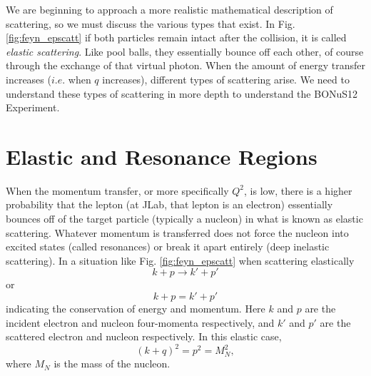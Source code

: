 We are beginning to approach a more realistic mathematical description of scattering, so we must discuss the various types that exist. In Fig. \ref{fig:feyn_epscatt} if both particles remain intact after the collision, it is called \textit{elastic scattering}. Like pool balls, they essentially bounce off each other, of course through the exchange of that virtual photon. When the amount of energy transfer increases ($i.e.$ when $q$ increases), different types of scattering arise. We need to understand these types of scattering in more depth to understand the BONuS12 Experiment.
\newpage
\section{Elastic and Resonance Regions}
When the momentum transfer, or more specifically $Q^2$, is low, there is a higher probability that the lepton (at JLab, that lepton is an electron) essentially bounces off of the target particle (typically a nucleon) in what is known as elastic scattering. Whatever momentum is transferred does not force the nucleon into excited states (called resonances) or break it apart entirely (deep inelastic scattering). In a situation like Fig. \ref{fig:feyn_epscatt} when scattering elastically
\begin{equation}
k+p \longrightarrow k' + p'
\end{equation}
or
\begin{equation}
k + p = k' + p'
\end{equation}
indicating the conservation of energy and momentum. Here $k$ and $p$ are the incident electron and nucleon four-momenta respectively, and $k'$ and $p'$ are the scattered electron and nucleon respectively. In this elastic case,
\begin{equation}
(k+q)^2 = p^2 = M_N^2,
\end{equation}
where $M_N$ is the mass of the nucleon. 

